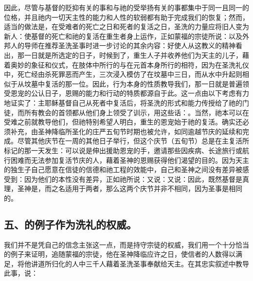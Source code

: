 因此，尽管与基督的贬抑有关的事和与祂的受举扬有关的事都集中于同一且同一的位格，并且祂内一切天主性的能力和人性的软弱都有助于完成我们的恢复；然而，适当的做法是，在受难者的死亡之日和死者的复活之日，圣洗的力量应将旧人变为新人：使基督的死亡和祂的复活在重生者身上运作，正如蒙福的宗徒所说：以及外邦人的导师在推荐圣洗圣事时进一步讨论的其余内容：好使人从这教义的精神看出，那一日就是所选定的日子，时候到了，重生人子并收养他们为天主的儿子，藉着奥妙的象征和仪式，在肢体中所行的与在元首本身所行的相符，因为在圣洗礼仪中，死亡经由杀死罪恶而产生，三次浸入模仿了在坟墓中三日，而从水中升起则相似于从坟墓中复活的那一位。因此，行为本身的性质教导我们，那一日就是普遍领受恩宠的公认日子，恩赐的能力和行动的特质都源自于此。这一点由以下考虑有力地证实了：主耶稣基督自己从死者中复活后，将圣洗的形式和能力传授给了祂的门徒，而所有教会的首领都从他们身上领受了训示，用这些话：。当然，祂本可以在受难之前就教导他们，但祂特别希望人明白，重生的恩宠始于祂的复活。确实还必须补充，由圣神降临所圣化的庄严五旬节时期也被允许，如同逾越节庆的延续和完成。尽管其他庆节在一周的其他日子举行，但这个庆节（五旬节）总是在主复活所标记的那一天发生：可以说是伸出援助恩宠的手，邀请那些因疾病、长途旅行或航行困难而无法参加复活节庆的人，藉着圣神的恩赐获得他们渴望的目的。因为天主的独生子自己愿意在信徒的信德和祂工程的效能中，自己和圣神之间没有差异被感受到：因为他们的本性没有差异，正如祂所说：又说：又说：因此，既然基督是真理，圣神是，而之名适用于两者，那么这两个庆节并非不相同，因为圣事是相同的。\par


\subsection{五、的例子作为洗礼的权威。}

我们并不是凭自己的信念主张这一点，而是持守宗徒的权威，我们用一个十分恰当的例子来证明，追随蒙福的宗徒，他在圣神降临应许之日，使信者的人数得以满足，将他讲道所归化的人中三千人藉着圣洗圣事奉献给天主。在其忠实叙述中教导此事，说：\par

